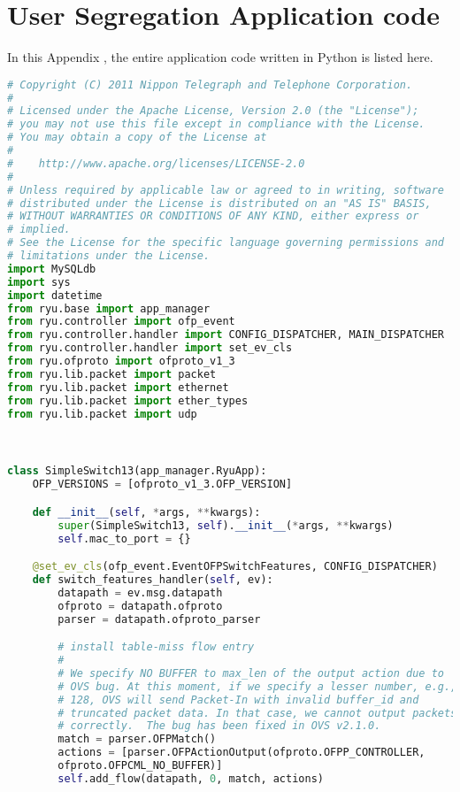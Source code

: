 
\chapter{User Segregation Application code}\label{app:ch:app_code}

In this Appendix , the entire application code written in Python is listed here.


\begin{lstlisting}[language = Python, caption={The User Segregation Mac Learning Application}, label={lst:userseg-code}]
# Copyright (C) 2011 Nippon Telegraph and Telephone Corporation.
#
# Licensed under the Apache License, Version 2.0 (the "License");
# you may not use this file except in compliance with the License.
# You may obtain a copy of the License at
#
#    http://www.apache.org/licenses/LICENSE-2.0
#
# Unless required by applicable law or agreed to in writing, software
# distributed under the License is distributed on an "AS IS" BASIS,
# WITHOUT WARRANTIES OR CONDITIONS OF ANY KIND, either express or
# implied.
# See the License for the specific language governing permissions and
# limitations under the License.
import MySQLdb
import sys
import datetime
from ryu.base import app_manager
from ryu.controller import ofp_event
from ryu.controller.handler import CONFIG_DISPATCHER, MAIN_DISPATCHER
from ryu.controller.handler import set_ev_cls
from ryu.ofproto import ofproto_v1_3
from ryu.lib.packet import packet
from ryu.lib.packet import ethernet
from ryu.lib.packet import ether_types
from ryu.lib.packet import udp



class SimpleSwitch13(app_manager.RyuApp):
	OFP_VERSIONS = [ofproto_v1_3.OFP_VERSION]

	def __init__(self, *args, **kwargs):
		super(SimpleSwitch13, self).__init__(*args, **kwargs)
		self.mac_to_port = {}

	@set_ev_cls(ofp_event.EventOFPSwitchFeatures, CONFIG_DISPATCHER)
	def switch_features_handler(self, ev):
		datapath = ev.msg.datapath
		ofproto = datapath.ofproto
		parser = datapath.ofproto_parser

		# install table-miss flow entry
		#
		# We specify NO BUFFER to max_len of the output action due to
		# OVS bug. At this moment, if we specify a lesser number, e.g.,
		# 128, OVS will send Packet-In with invalid buffer_id and
		# truncated packet data. In that case, we cannot output packets
		# correctly.  The bug has been fixed in OVS v2.1.0.
		match = parser.OFPMatch()
		actions = [parser.OFPActionOutput(ofproto.OFPP_CONTROLLER,
		ofproto.OFPCML_NO_BUFFER)]
		self.add_flow(datapath, 0, match, actions)


\end{lstlisting}
